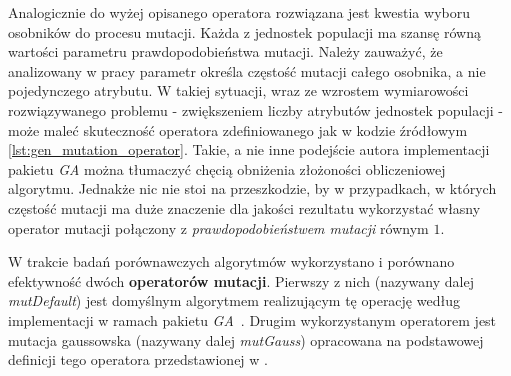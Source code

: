 Analogicznie do wyżej opisanego operatora rozwiązana jest kwestia wyboru osobników do procesu mutacji. Każda z jednostek populacji ma szansę równą wartości parametru prawdopodobieństwa mutacji. Należy zauważyć, że analizowany w pracy parametr określa częstość mutacji całego osobnika, a nie pojedynczego atrybutu. W takiej sytuacji, wraz ze wzrostem wymiarowości rozwiązywanego problemu - zwiększeniem liczby atrybutów jednostek populacji - może maleć skuteczność operatora zdefiniowanego jak w kodzie źródłowym \ref{lst:gen_mutation_operator}. Takie, a nie inne podejście autora implementacji pakietu \emph{GA} można tłumaczyć chęcią obniżenia złożoności obliczeniowej algorytmu. Jednakże nic nie stoi na przeszkodzie, by w przypadkach, w których częstość mutacji ma duże znaczenie dla jakości rezultatu wykorzystać własny operator mutacji połączony z \emph{prawdopodobieństwem mutacji} równym $1$.


\par
W trakcie badań porównawczych algorytmów wykorzystano i porównano efektywność dwóch \textbf{operatorów mutacji}. Pierwszy z nich (nazywany dalej \emph{mutDefault}) jest domyślnym algorytmem realizującym tę operację według implementacji w ramach pakietu \emph{GA}~\cite{gaPackage}. Drugim wykorzystanym operatorem jest mutacja gaussowska (nazywany dalej \emph{mutGauss}) opracowana na podstawowej definicji tego operatora przedstawionej w \cite{arabas2001wyklady}. 

